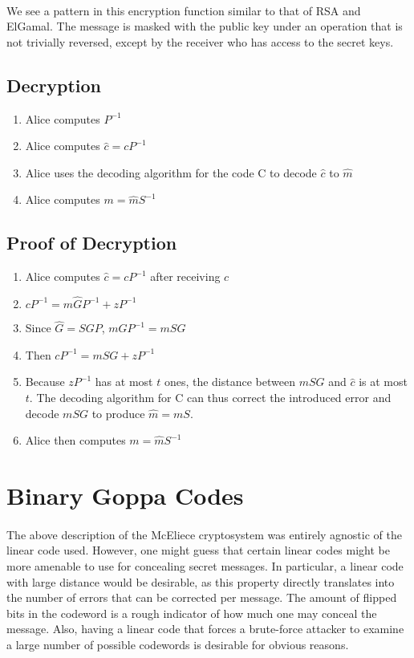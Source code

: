 \documentclass[12pt]{article}
\theoremstyle{definition}
\begin{document}
	\paragraph{} We see a pattern in this encryption function similar to that of RSA and ElGamal.  The message is masked with the public key under an operation that is not trivially reversed, except by the receiver who has access to the secret keys.
	
	\subsection{Decryption}
	\begin{enumerate}[1)]
	\item Alice computes $P^{-1}$
	\item Alice computes ${\hat c} = cP^{-1}$
	\item Alice uses the decoding algorithm for the code C to decode ${\hat c}$ to ${\hat m}$
	\item Alice computes $m = {\hat m}S^{-1}$
	\end{enumerate}

	\subsection{Proof of Decryption}
	\begin{enumerate}
	\item Alice computes ${\hat c} = cP^{-1}$ after receiving $c$
	\item $cP^{-1} = m{\hat G}P^{-1} + zP^{-1}$
	\item Since ${\hat G} = SGP$, $m{\hat G}P^{-1} = mSG$
	\item Then $cP^{-1} = mSG + zP^{-1}$ 
	\item Because $zP^{-1}$ has at most $t$ ones, the distance between $mSG$ and ${\hat c}$ is at most $t$.  The decoding algorithm for C can thus correct the introduced error and decode $mSG$ to produce ${\hat m} = mS$.
	\item Alice then computes $m = {\hat m}S^{-1}$
	\end{enumerate}


\section{Binary Goppa Codes}
\paragraph{}
The above description of the McEliece cryptosystem was entirely agnostic of the linear code used. However, one might guess that certain linear codes might be more amenable to use for concealing secret messages. In particular, a linear code with large distance would be desirable, as this property directly translates into the number of errors that can be corrected per message. The amount of flipped bits in the codeword is a rough indicator of how much one may conceal the message. Also, having a linear code that forces a brute-force attacker to examine a large number of possible codewords is desirable for obvious reasons. 
\end{document}
